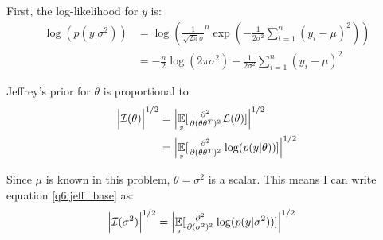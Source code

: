 
First, the log-likelihood for $y$ is:
\begin{align}
    \label{q6:llike}
    \log(p(y|\sigma^2)) &= \log(\frac{1}{\sqrt{2\pi}\sigma}^n \exp(-\frac{1}{2\sigma^2}\sum_{i=1}^n(y_i-\mu)^2))\nonumber\\
                        &= -\frac{n}{2}\log(2\pi\sigma^2) - \frac{1}{2\sigma^2}\sum_{i=1}^n(y_i-\mu)^2
\end{align}


Jeffrey's prior for $\theta$ is proportional to:
\begin{align}
    \label{q6:jeff_base}
\Big| \fishinf{\theta} \Big|^{1/2} &= \Big|\expec[y]{\secpartiald{}{(\theta\theta^T)}\loglike{\theta}}\Big|^{1/2}\nonumber\\
                                   &= \Big|\expec[y]{\secpartiald{}{(\theta\theta^T)}\log(p(y|\theta))}\Big|^{1/2}
\end{align}

Since $\mu$ is known in this problem, $\theta = \sigma^2$ is a scalar. 
This means I can write equation \ref{q6:jeff_base} as:
\begin{align}
    \label{q6:jeff_scalar}
    \Big| \fishinf{\sigma^2} \Big|^{1/2} &= \Big|\expec[y]{\secpartiald{}{(\sigma^2)}\log(p(y|\sigma^2))}\Big|^{1/2}
\end{align}


